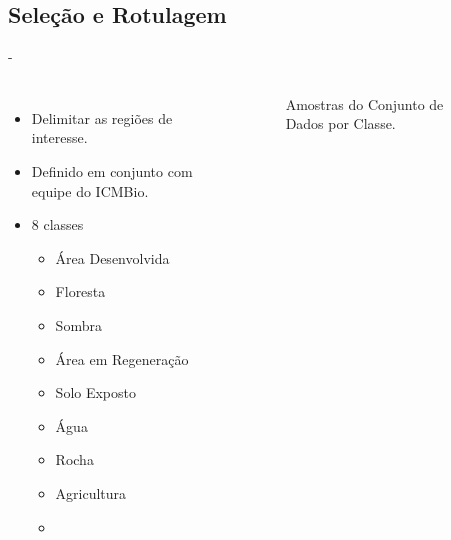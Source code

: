 \documentclass[%
  10pt,%
  aspectratio = 169,%
  compress,%
  t,%
  english,%
  brazilian,%
  tikz,
]{beamer}
\begin{document}
\subsection{Seleção e Rotulagem}\label{ssec:matmet5}

\begin{frame}
 - \color{gray}{Rotulagem}
\begin{columns}[T]
\begin{itemize}
    \item Delimitar as regiões de interesse.
    \item Definido em conjunto com equipe do ICMBio.
    \item 8 classes
    \begin{itemize}
        \item Área Desenvolvida
        \item Floresta
        \item Sombra
        \item Área em Regeneração
        \item Solo Exposto
        \item Água
        \item Rocha
        \item Agricultura
        \item \color{red}{Piscina}
    \end{itemize}
\end{itemize}
\begin{figure}[!htb]
\centering%
\caption{Amostras do Conjunto de Dados por Classe.}%
\label{fig:obter_imagens}
\end{figure}
\end{columns}
\end{frame}
\end{document}
